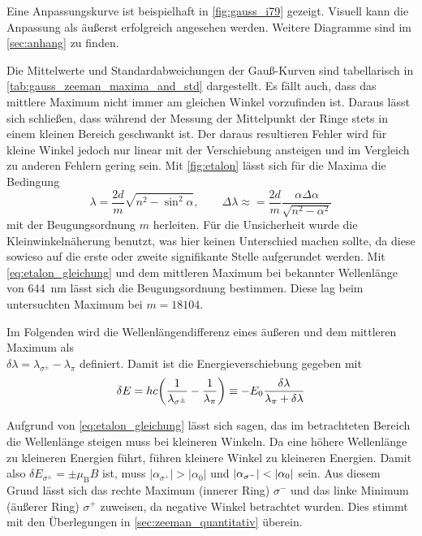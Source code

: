 Eine Anpassungskurve ist beispielhaft in \cref{fig:gauss_i79} gezeigt. Visuell
kann die Anpassung als äußerst erfolgreich angesehen werden. Weitere Diagramme 
sind im \cref{sec:anhang} zu finden.

Die Mittelwerte und Standardabweichungen der Gauß-Kurven sind tabellarisch in \cref{tab:gauss_zeeman_maxima_and_std}
dargestellt. Es fällt auch, dass das mittlere Maximum nicht immer am gleichen Winkel vorzufinden ist. Daraus lässt sich 
schließen, dass während der Messung der Mittelpunkt der Ringe stets in einem kleinen Bereich geschwankt 
ist. Der daraus resultieren Fehler wird für kleine Winkel 
jedoch nur linear mit der Verschiebung ansteigen und im Vergleich zu anderen Fehlern gering sein.
Mit \cref{fig:etalon} lässt sich für die Maxima die Bedingung 
\begin{equation}
    \lambda = \frac{2d}{m}\sqrt{n^2-\sin^2\alpha}, \qquad 
    \Delta\lambda \approx = \frac{2d}{m}\frac{\alpha \Delta\alpha}{\sqrt{n^2 - \alpha^2}}
    \label{eq:etalon_gleichung}
\end{equation}
mit der Beugungsordnung $m$ herleiten. Für die Unsicherheit wurde die Kleinwinkelnäherung benutzt, was 
hier keinen Unterschied machen sollte, da diese sowieso auf die erste oder zweite signifikante Stelle
aufgerundet werden.
Mit \cref{eq:etalon_gleichung} und dem mittleren Maximum bei bekannter Wellenlänge von \SI{644}{\nm}
lässt sich die Beugungsordnung bestimmen. Diese lag beim untersuchten Maximum bei 
$m = \num{18104}$.

Im Folgenden wird die Wellenlängendifferenz eines äußeren und dem mittleren Maximum als 
\\$\delta\lambda = \lambda_{\sigma^\pm} - \lambda_\pi$ definiert. Damit ist die 
Energieverschiebung gegeben mit 
\begin{equation*}
    \delta E = hc\qty(\frac{1}{\lambda_{\sigma^\pm}} - \frac{1}{\lambda_\pi})
        \equiv -E_0\frac{\delta\lambda}{\lambda_\pi+\delta\lambda}
\end{equation*}

Aufgrund von \cref{eq:etalon_gleichung} lässt sich sagen, das im betrachteten Bereich 
die Wellenlänge steigen muss bei kleineren Winkeln. Da eine höhere Wellenlänge zu kleineren 
Energien führt, führen kleinere Winkel zu kleineren Energien. Damit also 
$\delta E_{\sigma^\pm} = \pm \mu_\mathrm B B$ ist, muss $|\alpha_{\sigma^+}| > |\alpha_0|$
und $\abs{\alpha_{\sigma^-}} < \abs{\alpha_0}$ sein. Aus diesem Grund 
lässt sich das rechte Maximum (innerer Ring) $\sigma^-$ und das linke Minimum 
(äußerer Ring) $\sigma^+$ zuweisen, da negative Winkel betrachtet wurden. Dies stimmt mit 
den Überlegungen in \cref{sec:zeeman_quantitativ} überein.

